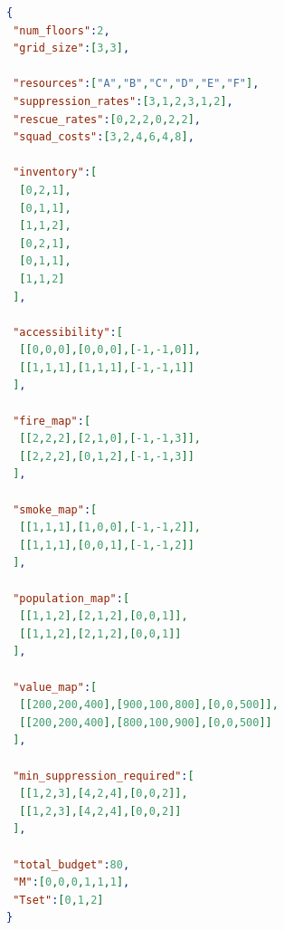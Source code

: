 \begin{figure}[!htb]
\centering
\begin{minipage}{0.9\textwidth}
\begin{lstlisting}[language=json,caption={Input configuration for the second demonstration case}]
{
 "num_floors":2,
 "grid_size":[3,3],

 "resources":["A","B","C","D","E","F"],
 "suppression_rates":[3,1,2,3,1,2],
 "rescue_rates":[0,2,2,0,2,2],
 "squad_costs":[3,2,4,6,4,8],

 "inventory":[
  [0,2,1],
  [0,1,1],
  [1,1,2],
  [0,2,1],
  [0,1,1],
  [1,1,2]
 ],

 "accessibility":[
  [[0,0,0],[0,0,0],[-1,-1,0]],
  [[1,1,1],[1,1,1],[-1,-1,1]]
 ],

 "fire_map":[
  [[2,2,2],[2,1,0],[-1,-1,3]],
  [[2,2,2],[0,1,2],[-1,-1,3]]
 ],

 "smoke_map":[
  [[1,1,1],[1,0,0],[-1,-1,2]],
  [[1,1,1],[0,0,1],[-1,-1,2]]
 ],

 "population_map":[
  [[1,1,2],[2,1,2],[0,0,1]],
  [[1,1,2],[2,1,2],[0,0,1]]
 ],

 "value_map":[
  [[200,200,400],[900,100,800],[0,0,500]],
  [[200,200,400],[800,100,900],[0,0,500]]
 ],

 "min_suppression_required":[
  [[1,2,3],[4,2,4],[0,0,2]],
  [[1,2,3],[4,2,4],[0,0,2]]
 ],

 "total_budget":80,
 "M":[0,0,0,1,1,1],
 "Tset":[0,1,2]
}
\end{lstlisting}
\end{minipage}
\end{figure}

